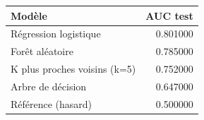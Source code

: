 \begin{tabular}{lr}
\toprule
Modèle & AUC test \\
\midrule
Régression logistique & 0.801000 \\
Forêt aléatoire & 0.785000 \\
K plus proches voisins (k=5) & 0.752000 \\
Arbre de décision & 0.647000 \\
Référence (hasard) & 0.500000 \\
\bottomrule
\end{tabular}
